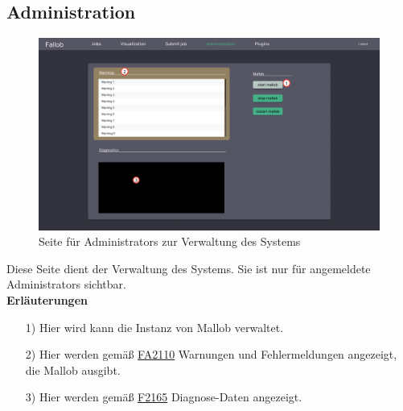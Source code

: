 \subsection{Administration}
\label{pages:admin}
\begin{figure}[H]
    \centering
    \includegraphics[width=\textwidth]{images-interface/v4_interface/admin_page_4.pdf}
    \caption{Seite für \glspl{Administrator} zur Verwaltung des Systems}
    \label{fig:admin-page}
\end{figure}
Diese Seite dient der Verwaltung des Systems. Sie ist nur für angemeldete \glspl{Administrator} sichtbar. \\

\textbf{Erläuterungen}
\begin{itemize}
    \item[1)] Hier wird kann die Instanz von Mallob verwaltet.
    \item[2)] Hier werden gemäß \hyperref[FA:Web-Interface:Anzeigen von Warungen und Fehlermeldungen]{FA2110} Warnungen und Fehlermeldungen angezeigt, die Mallob ausgibt.
    \item[3)] Hier werden gemäß \hyperref[FA:Web-Interface:Anzeigen von Diagnosedaten]{F2165} Diagnose-Daten angezeigt.
\end{itemize}

